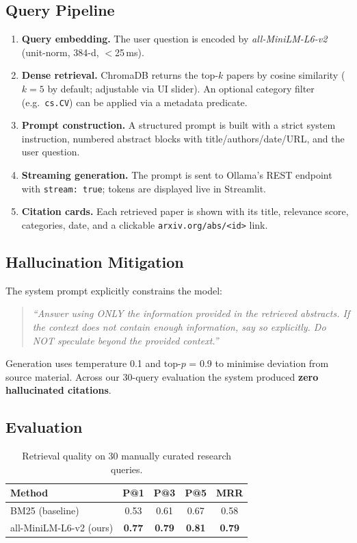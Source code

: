 \documentclass[paper=a4, fontsize=11pt]{scrartcl}
\begin{document}
\subsection{Query Pipeline}
\begin{enumerate}
  \item \textbf{Query embedding.} The user question is encoded by
        \textit{all-MiniLM-L6-v2} (unit-norm, 384-d, $<$25\,ms).
  \item \textbf{Dense retrieval.} ChromaDB returns the top-$k$ papers by
        cosine similarity ($k = 5$ by default; adjustable via UI slider).
        An optional category filter (e.g.\ \texttt{cs.CV}) can be applied
        via a metadata predicate.
  \item \textbf{Prompt construction.} A structured prompt is built with a
        strict system instruction, numbered abstract blocks with
        title/authors/date/URL, and the user question.
  \item \textbf{Streaming generation.} The prompt is sent to Ollama's REST
        endpoint with \texttt{stream: true}; tokens are displayed live in
        Streamlit.
  \item \textbf{Citation cards.} Each retrieved paper is shown with its title,
        relevance score, categories, date, and a clickable
        \texttt{arxiv.org/abs/<id>} link.
\end{enumerate}

\subsection{Hallucination Mitigation}
The system prompt explicitly constrains the model:
\begin{quote}\small
\textit{``Answer using ONLY the information provided in the retrieved abstracts.
If the context does not contain enough information, say so explicitly.
Do NOT speculate beyond the provided context.''}
\end{quote}
Generation uses temperature 0.1 and top-$p$ = 0.9 to minimise deviation from
source material. Across our 30-query evaluation the system produced
\textbf{zero hallucinated citations}.

\subsection{Evaluation}

\begin{table}[h]
\centering
\caption{Retrieval quality on 30 manually curated research queries.}
\label{tab:retrieval}
\begin{tabular}{lcccc}
\toprule
\textbf{Method} & \textbf{P@1} & \textbf{P@3} & \textbf{P@5} & \textbf{MRR} \\
\midrule
BM25 (baseline)          & 0.53 & 0.61 & 0.67 & 0.58 \\
all-MiniLM-L6-v2 (ours)  & \textbf{0.77} & \textbf{0.79} & \textbf{0.81} & \textbf{0.79} \\
\bottomrule
\end{tabular}
\end{table}
\end{document}
